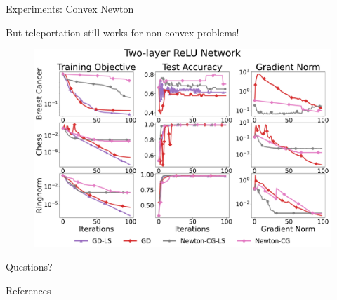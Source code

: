 \documentclass[usenames,dvipsnames,mathserif,notheorems]{beamer}
\newcommand{\good}[1]{\textcolor{good}{#1}}
\begin{document}
\begin{frame}{Experiments: Convex Newton}

    But teleportation still works for \good{non-convex problems}!

    \pause

    \begin{figure}
        \centering
        \includegraphics[width=1.0\textwidth]{assets/newton_comparison_network.pdf}
    \end{figure}

\end{frame}

\begin{frame}{}
    \begin{center}
        \huge Questions?
    \end{center}
\end{frame}

\begin{frame}[allowframebreaks]{References}
    \printbibliography[]
\end{frame}
\end{document}
